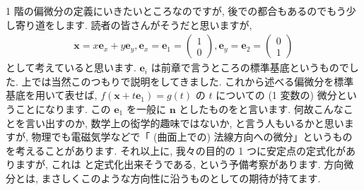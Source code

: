 \documentclass[openany, a4paper, oneside]{book}
\theoremstyle{break}
\theoremstyle{breakdefn}
\begin{document}
1 階の偏微分の定義にいきたいところなのですが, 後での都合もあるのでもう少し寄り道をします.
読者の皆さんがそうだと思いますが,
\begin{align}
 \bm{x}=x \bm{e}_x + y \bm{e}_y,
 \bm{e}_x=\bm{e}_1=\begin{pmatrix}1\\0\end{pmatrix},
 \bm{e}_y=\bm{e}_2=\begin{pmatrix}0\\1\end{pmatrix}
\end{align}
 として考えていると思います.
$\bm{e}_i$ は前章で言うところの標準基底というものでした.
上では当然このつもりで説明をしてきました.
これから述べる偏微分を標準基底を用いて表せば,
$f (\bm{x}+t\bm{e}_1)=g (t)$ の $t$ についての (1 変数の) 微分ということになります.
この $\bm{e}_1$ を一般に $\bm{n}$ としたものをと言います.
何故こんなことを言い出すのか, 数学上の衒学的趣味ではないか, と言う人もいるかと思いますが,
物理でも電磁気学などで「 (曲面上での) 法線方向への微分」というものを考えることがあります.
それ以上に, 我々の目的の 1 つに安定点の定式化がありますが, これは
と定式化出来そうである, という予備考察があります.
方向微分とは, まさしくこのような方向性に沿うものとしての期待が持てます.
\end{document}
